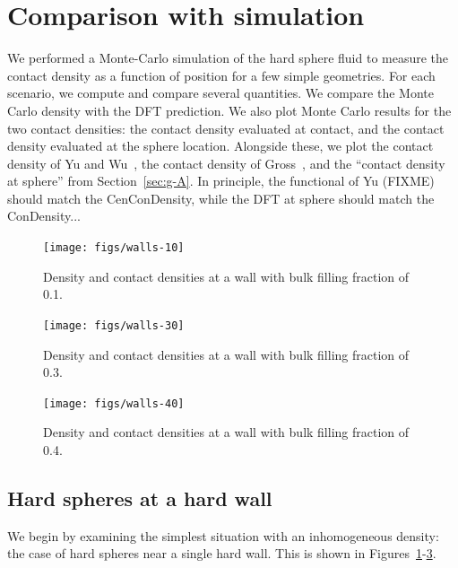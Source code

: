 \documentclass[letterpaper,twocolumn,amsmath,amssymb,jcp,10pt,aip]{revtex4-1}
\begin{document}
\section{Comparison with simulation}

We performed a Monte-Carlo simulation of the hard sphere fluid to
measure the contact density as a function of position for a few simple
geometries.  For each scenario, we compute and compare several
quantities.  We compare the Monte Carlo density with the DFT
prediction.  We also plot Monte Carlo results for the two contact
densities: the contact density evaluated at contact, and the contact
density evaluated at the sphere location.  Alongside these, we plot
the contact density of Yu and
Wu~\cite{yu2002fmt-dft-inhomogeneous-associating}, the contact density
of Gross~\cite{gross2009density}, and the ``contact density at
sphere'' from Section~\ref{sec:g-A}.  In principle, the
functional of Yu (FIXME) should match the CenConDensity, while the DFT
at sphere should match the ConDensity...

\begin{figure}
  \texttt{[image: figs/walls-10]}
  \caption{Density and contact densities at a wall with bulk filling
    fraction of 0.1.}
  \label{fig:walls-10}
\end{figure}

\begin{figure}
  \texttt{[image: figs/walls-30]}
  \caption{Density and contact densities at a wall with bulk filling
    fraction of 0.3.}
  \label{fig:walls-30}
\end{figure}

\begin{figure}
  \texttt{[image: figs/walls-40]}
  \caption{Density and contact densities at a wall with bulk filling
    fraction of 0.4.}
  \label{fig:walls-40}
\end{figure}

\subsection{Hard spheres at a hard wall}

We begin by examining the simplest situation with an inhomogeneous
density:  the case of hard spheres near a single hard wall.  This is
shown in Figures~\ref{fig:walls-10}-\ref{fig:walls-40}.



\newcommand\sphereExplanation{ Blue curves describe the density of
  hard spheres.  Green curves describe the contact density averaged
  according to the point of contact.  Red curves describe the contact
  density as averaged according to the centers of the spheres that are
  touching.  In each case, solid lines correspond to the Monte Carlo
  simulation, and dashed lines of various sorts represent DFT model
  predictions.  }
\end{document}
